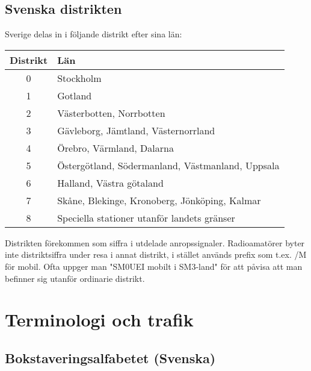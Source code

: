 \subsection{Svenska distrikten}

Sverige delas in i följande distrikt efter sina län:

\begin{center}
\begin{tabular}{cl}
	\textbf{Distrikt} & \textbf{Län}                                     \\ \hline %
	      0        & Stockholm                                        \\
	      1        & Gotland                                          \\
	      2        & Västerbotten, Norrbotten                         \\
	      3        & Gävleborg, Jämtland, Västernorrland              \\
	      4        & Örebro, Värmland, Dalarna                        \\
	      5        & Östergötland, Södermanland, Västmanland, Uppsala \\
	      6        & Halland, Västra götaland                         \\
	      7        & Skåne, Blekinge, Kronoberg, Jönköping, Kalmar    \\
	      8        & Speciella stationer utanför landets gränser
\end{tabular}
\end{center}

Distrikten förekommen som siffra i utdelade anropssignaler. Radioamatörer byter inte distriktsiffra under resa i annat distrikt, i stället används prefix som t.ex. /M för mobil. Ofta uppger man "SM0UEI mobilt i SM3-land" för att påvisa att man befinner sig utanför ordinarie distrikt.

\section{Terminologi och trafik}

\subsection{Bokstaveringsalfabetet (Svenska)}

